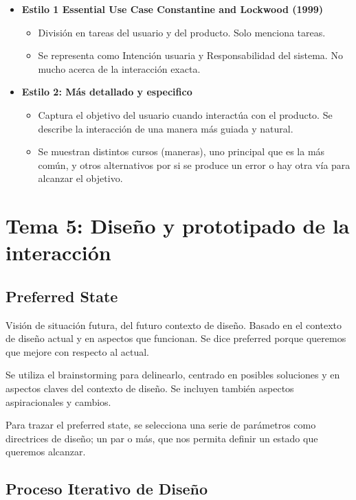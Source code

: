 \documentclass[12pt, twoside, openright]{report} %
\begin{document}
\begin{itemize}
	\item \textbf{Estilo 1 Essential Use Case Constantine and Lockwood (1999)}
	      \begin{itemize}
		      \item División en tareas del usuario y del producto. Solo menciona tareas.
		      \item Se representa como Intención usuaria y Responsabilidad del sistema. No mucho acerca de la interacción exacta.
	      \end{itemize}
	\item \textbf{Estilo 2: Más detallado y especifico}
	      \begin{itemize}
		      \item Captura el objetivo del usuario cuando interactúa con el producto. Se describe la interacción de una manera más guiada y natural.
		      \item Se muestran distintos cursos (maneras), uno principal que es la más común, y otros alternativos por si se produce un error o hay otra vía para alcanzar el objetivo.
	      \end{itemize}
\end{itemize}

\chapter{Tema 5: Diseño y prototipado de la interacción}

\section{Preferred State}
Visión de situación futura, del futuro contexto de diseño. Basado en el contexto de diseño actual y en aspectos que funcionan. Se dice preferred porque queremos que mejore con respecto al actual.

Se utiliza el brainstorming para delinearlo, centrado en posibles soluciones y en aspectos claves del contexto de diseño. Se incluyen también aspectos aspiracionales y cambios.

Para trazar el preferred state, se selecciona una serie de parámetros como directrices de diseño; un par o más, que nos permita definir un estado que queremos alcanzar.

\section{Proceso Iterativo de Diseño}
\end{document}
